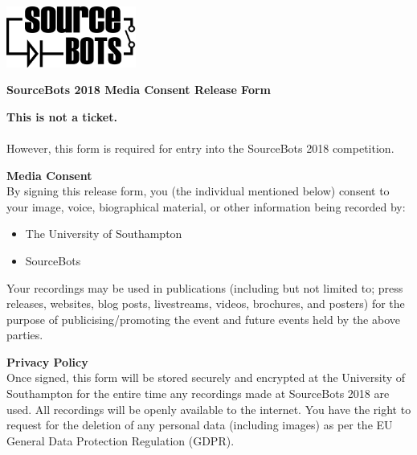 \documentclass[a4paper]{article}
\begin{document}
\newcommand{\compyear}{2018\xspace}
\newcommand{\competition}{SourceBots \compyear}

\begin{minipage}[c]{0.30\textwidth}
\includegraphics[height=2cm]{fig-SourceBots}
\end{minipage}
\hspace{0.03\textwidth}
\begin{minipage}[c]{0.67\textwidth}
\begin{center}
{\large \textbf{\competition Media Consent Release Form} \par}
\end{center}
\end{minipage}
\vspace{1cm}

\textbf{This is not a ticket.}\\\\ However, this form is required for entry into the \competition competition.\\
\vspace{0.3cm}

\textbf{\large Media Consent}\\

By signing this release form, you (the individual mentioned below) consent to your image, voice, biographical material, or other information being recorded by:
\begin{itemize}
    \item The University of Southampton
    \item SourceBots
\end{itemize}
Your recordings may be used in publications (including but not limited to; press releases, websites, blog posts, livestreams, videos, brochures, and posters) for the purpose of publicising/promoting the event and future events held by the above parties.

\vspace{0.5cm}
\textbf{\large Privacy Policy}\\

Once signed, this form will be stored securely and encrypted at the University of Southampton for the entire time any recordings made at \competition are used. All recordings will be openly available to the internet. You have the right to request for the deletion of any personal data (including images) as per the EU General Data Protection Regulation (GDPR).
\end{document}
